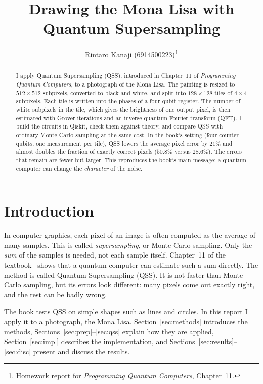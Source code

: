 \documentclass[10pt,twocolumn,a4paper]{article}
\title{Drawing the Mona Lisa with Quantum Supersampling}
\author{Rintaro Kanaji (6914500223)\thanks{Homework report for \emph{Programming Quantum
Computers}, Chapter~11.}}
\date{}
\begin{document}
\maketitle

\begin{abstract}
I apply Quantum Supersampling (QSS), introduced in Chapter~11 of
\emph{Programming Quantum Computers}, to a photograph of the Mona Lisa.
The painting is resized to $512\times512$ subpixels, converted to black and
white, and split into $128\times128$ tiles of $4\times4$ subpixels.
Each tile is written into the phases of a four-qubit register.
The number of white subpixels in the tile, which gives the brightness of one
output pixel, is then estimated with Grover iterations and an inverse quantum
Fourier transform (QFT).
I build the circuits in Qiskit, check them against theory, and compare QSS with
ordinary Monte Carlo sampling at the same cost.
In the book's setting (four counter qubits, one measurement per tile), QSS
lowers the average pixel error by $21\%$ and almost doubles the fraction of
exactly correct pixels ($50.8\%$ versus $28.6\%$).
The errors that remain are fewer but larger. This reproduces the book's main
message: a quantum computer can change the \emph{character} of the noise.
\end{abstract}

\section{Introduction}

In computer graphics, each pixel of an image is often computed as the average of
many samples. This is called \emph{supersampling}, or Monte Carlo sampling.
Only the \emph{sum} of the samples is needed, not each sample itself.
Chapter~11 of the textbook~\cite{pqc} shows that a quantum computer can estimate
such a sum directly. The method is called Quantum Supersampling (QSS). It is not
faster than Monte Carlo sampling, but its errors look different: many pixels
come out exactly right, and the rest can be badly wrong.

The book tests QSS on simple shapes such as lines and circles.
In this report I apply it to a photograph, the Mona Lisa.
Section~\ref{sec:methods} introduces the methods,
Sections~\ref{sec:prep}--\ref{sec:qss} explain how they are applied,
Section~\ref{sec:impl} describes the implementation, and
Sections~\ref{sec:results}--\ref{sec:disc} present and discuss the results.
\end{document}
